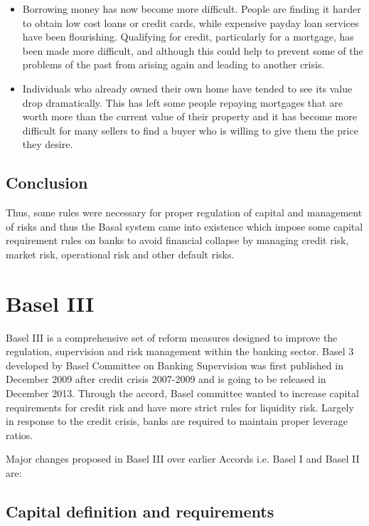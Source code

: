 \documentclass[11pt]{article}
\numberwithin{equation}{section}
\begin{document}
\begin{itemize}
\item Borrowing money has now become more difficult. People are finding it harder to obtain low cost loans or credit cards, while expensive payday loan services have been flourishing. Qualifying for credit, particularly for a mortgage, has been made more difficult, and although this could help to prevent some of the problems of the past from arising again and leading to another crisis.

\item Individuals who already owned their own home have tended to see its value drop dramatically. This has left some people repaying mortgages that are worth more than the current value of their property and it has become more difficult for many sellers to find a buyer who is willing to give them the price they desire.

\end{itemize}

\subsection{Conclusion}
Thus, some rules were necessary for proper regulation of capital and management of risks and thus the Basal system came into existence which impose some capital requirement rules on banks to avoid financial collapse by managing credit risk, market risk, operational risk and other default risks.

\pagebreak

\section{Basel III}
\medskip

Basel III is a comprehensive set of reform measures designed to improve the regulation, supervision and risk management within the banking sector. Basel 3 developed by Basel Committee on Banking Supervision was first published in December 2009 after credit crisis 2007-2009 and is going to be released in December 2013. Through the accord, Basel committee wanted to increase capital requirements for credit risk and have more strict rules for liquidity risk. Largely in response to the credit crisis, banks are required to maintain proper leverage ratios. 

\hspace{1cm}Major changes proposed in Basel III over earlier Accords i.e. Basel I and Basel II are:
\subsection{Capital definition and requirements}
\medskip
\end{document}
